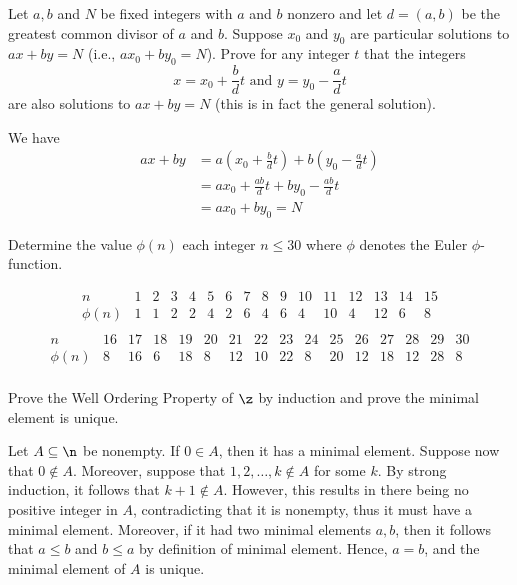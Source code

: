 \begin{problems}
\begin{sol}
    \end{sol}
    \item Let $a, b$ and $N$ be fixed integers with $a$ and $b$ nonzero and let $d = (a, b)$ be the greatest common divisor of $a$ and $b$. Suppose $x_0$ and $y_0$ are particular solutions to $ax + by = N$ (i.e., $ax_0 + by_0 = N$). Prove for any integer $t$ that the integers
    $$x = x_0 + \frac bdt \text{ and } y = y_0 - \frac adt$$
    are also solutions to $ax + by = N$ (this is in fact the general solution).
    \begin{sol}
        We have
        \begin{align*}
            ax + by & = a\left(x_0 + \frac bdt\right) + b\left(y_0 - \frac adt\right) \\
            & = ax_0 + \frac{ab}{d}t + by_0 - \frac{ab}{d}t \\
            & = ax_0 + by_0 = N
        \end{align*}
    \end{sol}
    \item Determine the value $\phi(n)$  each integer $n \leq 30$ where $\phi$ denotes the Euler $\phi$-function.
    \begin{sol}
        $$\begin{array}{c|c|c|c|c|c|c|c|c|c|c|c|c|c|c|c}
            n & 1 & 2 & 3 & 4 & 5 & 6 & 7 & 8 & 9 & 10 & 11 & 12 & 13 & 14 & 15 \\
            \hline
            \phi(n) & 1 & 1 & 2 & 2 & 4 & 2 & 6 & 4 & 6 & 4 & 10 & 4 & 12 & 6 & 8 \\
        \end{array}$$
        $$\begin{array}{c|c|c|c|c|c|c|c|c|c|c|c|c|c|c|c}
            n & 16 & 17 & 18 & 19 & 20 & 21 & 22 & 23 & 24 & 25 & 26 & 27 & 28 & 29 & 30 \\
            \hline
            \phi(n) & 8 & 16 & 6 & 18 & 8 & 12 & 10 & 22 & 8 & 20 & 12 & 18 & 12 & 28 & 8 \\
        \end{array}$$
    \end{sol}
    \item Prove the Well Ordering Property of $\z$ by induction and prove the minimal element is unique.
    \begin{sol}
        Let $A \subseteq \n$ be nonempty. If $0 \in A$, then it has a minimal element. Suppose now that $0 \not\in A$. Moreover, suppose that $1, 2, \ldots, k \not\in A$ for some $k$. By strong induction, it follows that $k + 1 \not\in A$. However, this results in there being no positive integer in $A$, contradicting that it is nonempty, thus it must have a minimal element. Moreover, if it had two minimal elements $a, b$, then it follows that $a \leq b$ and $b \leq a$ by definition of minimal element. Hence, $a = b$, and the minimal element of $A$ is unique.

\end{sol}
\end{problems}
